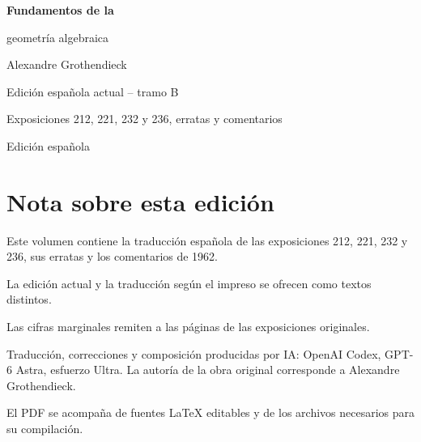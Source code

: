 \documentclass[11pt,twoside,openany]{book}
\newcommand{\FgaUnitKey}{frontmatter}
\theoremstyle{plain}
\theoremstyle{definition}
\theoremstyle{remark}
\begin{document}
\frontmatter
\begin{titlepage}
\centering
\vspace*{0.13\textheight}
{\Huge\bfseries Fundamentos de la\par geometría algebraica\par}
\vspace{1.5\baselineskip}
{\Large Alexandre Grothendieck\par}
\vfill
{\Large Edición española actual -- tramo B\par}
\vspace{\baselineskip}
{\large Exposiciones 212, 221, 232 y 236, erratas y comentarios\par}
\vspace{1.5\baselineskip}
{\normalsize Edición española\par}
\end{titlepage}
\chapter*{Nota sobre esta edición}
Este volumen contiene la traducción española de las exposiciones 212, 221, 232 y 236, sus erratas y los comentarios de 1962.

La edición actual y la traducción según el impreso se ofrecen como textos distintos.

Las cifras marginales remiten a las páginas de las exposiciones originales.

Traducción, correcciones y composición producidas por IA: OpenAI Codex, GPT-6 Astra, esfuerzo Ultra.
La autoría de la obra original corresponde a Alexandre Grothendieck.

El PDF se acompaña de fuentes LaTeX editables y de los archivos necesarios para su compilación.

\tableofcontents
\mainmatter
\def\FgaUnitKey{212}
\def\FgaUnitKey{e212}
\def\FgaUnitKey{221}
\def\FgaUnitKey{e221}
\def\FgaUnitKey{232}
\def\FgaUnitKey{e232}
\def\FgaUnitKey{236}
\def\FgaUnitKey{e236}
\def\FgaUnitKey{com}
\end{document}
